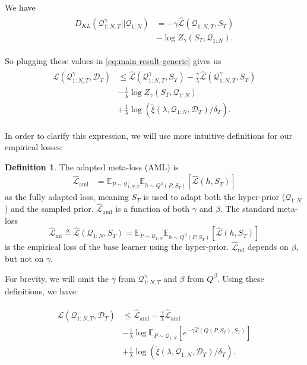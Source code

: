 \documentclass[letterpaper]{article} %
\theoremstyle{definition}
\newtheorem{defn}{Definition}[section]
\begin{document}
We have 
\begin{align*} 
\begin{split}
D_{KL}(\mathcal{Q}^{\gamma}_{1:N,T}||\mathcal{Q}_{1:N})&=
-\gamma\hat{\mathcal{L}}(\mathcal{Q}_{1:N,T}, S_T)\\
&-\log Z_\gamma(S_T, \mathcal{Q}_{1:N}) .
\end{split}
\end{align*}

So plugging these values in \eqref{eq:main-result-generic} gives us
\begin{align*} 
\begin{split}
\mathcal{L}(\mathcal{Q}^{\gamma}_{1:N,T}, \mathcal{D}_T) & \leq \hat{\mathcal{L}}(\mathcal{Q}^{\gamma}_{1:N,T}, S_T) -\frac{\gamma}{\lambda}\hat{\mathcal{L}}(\mathcal{Q}^{\gamma}_{1:N,T}, S_T) \\ &- \frac{1}{\lambda}\log Z_\gamma(S_T, \mathcal{Q}_{1:N})\\ &+\frac{1}{\lambda}\log\left (\tilde{\xi}(\lambda,\mathcal{Q}_{1:N},\mathcal{D}_T)/\delta_T\right ) .
\end{split}
\end{align*}

In order to clarify this expression, we will use more intuitive definitions for our empirical losses:
\begin{defn}
	The adapted meta-loss (AML) is  
	\begin{align*} 
	\hat{\mathcal{L}}_{\mathrm{aml}} 
	&=\mathbb{E}_{P\sim \mathcal{Q}^{\gamma}_{1:N,T}}\mathbb{E}_{h\sim Q^{\beta}(P,S_T)}\left [\hat{\mathcal{L}}(h, S_T)\right ]
	\end{align*} 
	as the fully adapted loss, meaning $S_T$ is used to adapt both the hyper-prior ($\mathcal{Q}_{1:N}$) and the sampled prior. $\hat{\mathcal{L}}_{\mathrm{aml}}$ is a function of both $\gamma$ and $\beta$. The standard meta-loss 
	$$
	\hat{\mathcal{L}}_{\mathrm{ml}}\triangleq \hat{\mathcal{L}}(\mathcal{Q}_{1:N}, S_T)=\mathbb{E}_{P\sim \mathcal{Q}_{1:N}}\mathbb{E}_{h\sim Q^{\beta}(P,S_T)}\left [\hat{\mathcal{L}}(h, S_T)\right ]
	$$ 
	is the empirical loss of the base learner using the hyper-prior. 
	$\hat{\mathcal{L}}_{\mathrm{ml}}$ depends on $\beta$, but not on $\gamma$.
\end{defn}

For brevity, we will omit the $\gamma$ from $\mathcal{Q}^{\gamma}_{1:N,T}$ and $\beta$ from $Q^{\beta}$. Using these definitions, we have:

\begin{align*} 
\begin{split}
\mathcal{L}(\mathcal{Q}_{1:N,T}, \mathcal{D}_T) &\leq \hat{\mathcal{L}}_{\mathrm{aml}} -\frac{\gamma}{\lambda}\hat{\mathcal{L}}_{\mathrm{aml}} \\
&- \frac{1}{\lambda}\log \mathbb{E}_{P\sim \mathcal{Q}_{1:N}}\left [e^{-\gamma\hat{\mathcal{L}}(Q(P,S_T),S_T)}\right ]\\
&+\frac{1}{\lambda}\log\left (\tilde{\xi}(\lambda,\mathcal{Q}_{1:N},\mathcal{D}_T)/\delta_T\right ) .
\end{split}
\end{align*}
\end{document}
